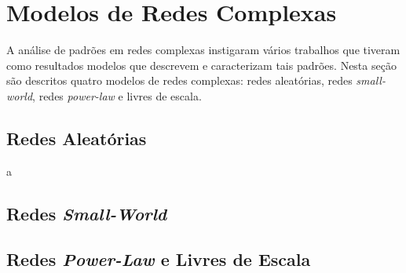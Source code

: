 \section{Modelos de Redes Complexas}

A análise de padrões em redes complexas instigaram vários trabalhos que tiveram como resultados modelos
que descrevem e caracterizam tais padrões. Nesta seção são descritos quatro modelos de redes complexas: 
redes aleatórias, redes \textit{small-world}, redes \textit{power-law} e livres de escala.

\subsection{Redes Aleatórias}

a

\subsection{Redes \textit{Small-World}}

\subsection{Redes \textit{Power-Law} e Livres de Escala}
